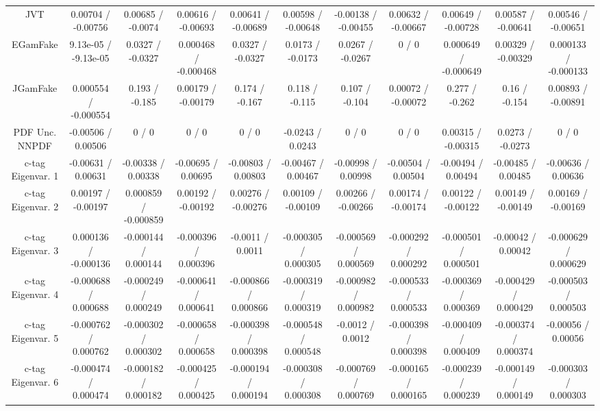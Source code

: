 \begin{table}[htbp]
\begin{center}
\begin{tabular}{|c|c|c|c|c|c|c|c|c|c|c|}
  JVT & 0.00704 / -0.00756 & 0.00685 / -0.0074 & 0.00616 / -0.00693 & 0.00641 / -0.00689 & 0.00598 / -0.00648 & -0.00138 / -0.00455 & 0.00632 / -0.00667 & 0.00649 / -0.00728 & 0.00587 / -0.00641 & 0.00546 / -0.00651 \\ 
  EGamFake & 9.13e-05 / -9.13e-05 & 0.0327 / -0.0327 & 0.000468 / -0.000468 & 0.0327 / -0.0327 & 0.0173 / -0.0173 & 0.0267 / -0.0267 & 0 / 0 & 0.000649 / -0.000649 & 0.00329 / -0.00329 & 0.000133 / -0.000133 \\ 
  JGamFake & 0.000554 / -0.000554 & 0.193 / -0.185 & 0.00179 / -0.00179 & 0.174 / -0.167 & 0.118 / -0.115 & 0.107 / -0.104 & 0.00072 / -0.00072 & 0.277 / -0.262 & 0.16 / -0.154 & 0.00893 / -0.00891 \\ 
  PDF Unc. NNPDF & -0.00506 / 0.00506 & 0 / 0 & 0 / 0 & 0 / 0 & -0.0243 / 0.0243 & 0 / 0 & 0 / 0 & 0.00315 / -0.00315 & 0.0273 / -0.0273 & 0 / 0 \\ 
  c-tag Eigenvar. 1 & -0.00631 / 0.00631 & -0.00338 / 0.00338 & -0.00695 / 0.00695 & -0.00803 / 0.00803 & -0.00467 / 0.00467 & -0.00998 / 0.00998 & -0.00504 / 0.00504 & -0.00494 / 0.00494 & -0.00485 / 0.00485 & -0.00636 / 0.00636 \\ 
  c-tag Eigenvar. 2 & 0.00197 / -0.00197 & 0.000859 / -0.000859 & 0.00192 / -0.00192 & 0.00276 / -0.00276 & 0.00109 / -0.00109 & 0.00266 / -0.00266 & 0.00174 / -0.00174 & 0.00122 / -0.00122 & 0.00149 / -0.00149 & 0.00169 / -0.00169 \\ 
  c-tag Eigenvar. 3 & 0.000136 / -0.000136 & -0.000144 / 0.000144 & -0.000396 / 0.000396 & -0.0011 / 0.0011 & -0.000305 / 0.000305 & -0.000569 / 0.000569 & -0.000292 / 0.000292 & -0.000501 / 0.000501 & -0.00042 / 0.00042 & -0.000629 / 0.000629 \\ 
  c-tag Eigenvar. 4 & -0.000688 / 0.000688 & -0.000249 / 0.000249 & -0.000641 / 0.000641 & -0.000866 / 0.000866 & -0.000319 / 0.000319 & -0.000982 / 0.000982 & -0.000533 / 0.000533 & -0.000369 / 0.000369 & -0.000429 / 0.000429 & -0.000503 / 0.000503 \\ 
  c-tag Eigenvar. 5 & -0.000762 / 0.000762 & -0.000302 / 0.000302 & -0.000658 / 0.000658 & -0.000398 / 0.000398 & -0.000548 / 0.000548 & -0.0012 / 0.0012 & -0.000398 / 0.000398 & -0.000409 / 0.000409 & -0.000374 / 0.000374 & -0.00056 / 0.00056 \\ 
  c-tag Eigenvar. 6 & -0.000474 / 0.000474 & -0.000182 / 0.000182 & -0.000425 / 0.000425 & -0.000194 / 0.000194 & -0.000308 / 0.000308 & -0.000769 / 0.000769 & -0.000165 / 0.000165 & -0.000239 / 0.000239 & -0.000149 / 0.000149 & -0.000303 / 0.000303 \\ 

\end{tabular}
\end{center}
\end{table}

